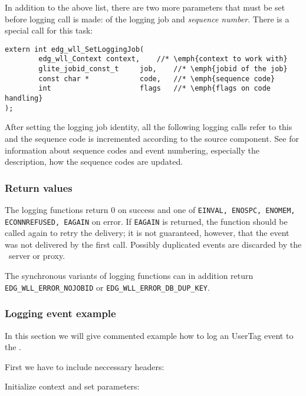 %
In addition to the above list, there are two more parameters that must
be set before logging call is made: \jobid of the logging job and
\emph{sequence number}. There is a special call for this task:
\begin{lstlisting}
extern int edg_wll_SetLoggingJob(
        edg_wll_Context context,	//* \emph{context to work with}
        glite_jobid_const_t     job,	//* \emph{jobid of the job}
        const char *            code,	//* \emph{sequence code}
        int                     flags	//* \emph{flags on code handling}
);
\end{lstlisting}
After setting the logging job identity, all the following logging
calls refer to this \jobid and the sequence code is incremented
according to the source component. See \cite{lbug} for information
about sequence codes and event numbering, especially the description,
how the sequence codes are updated.

\subsubsection{Return values}
The logging functions return 0 on success and one of \texttt{EINVAL,
ENOSPC, ENOMEM, ECONNREFUSED, EAGAIN} on error. If \texttt{EAGAIN} is
returned, the function should be called again to retry the delivery;
it is not guaranteed, however, that the event was not delivered by the
first call. Possibly duplicated events are discarded by the \LB\
server or proxy.

The synchronous variants of logging functions can in addition return
\verb'EDG_WLL_ERROR_NOJOBID' or \verb'EDG_WLL_ERROR_DB_DUP_KEY'.

\subsubsection{Logging event example}
In this section we will give commented example how to log an UserTag event to
the \LB.

First we have to include neccessary headers:


Initialize context and set parameters:




